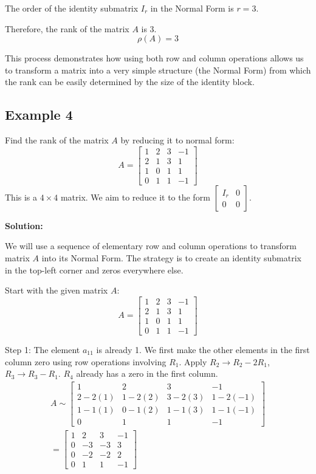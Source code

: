 \documentclass{article}
\begin{document}
The order of the identity submatrix $I_r$ in the Normal Form is $r=3$.

Therefore, the rank of the matrix $A$ is 3.
\[ \rho(A) = 3 \]

This process demonstrates how using both row and column operations allows us to transform a matrix into a very simple structure (the Normal Form) from which the rank can be easily determined by the size of the identity block.

\subsection{Example 4}
Find the rank of the matrix $A$ by reducing it to normal form:
\[ A = \begin{bmatrix} 1 & 2 & 3 & -1 \\ 2 & 1 & 3 & 1 \\ 1 & 0 & 1 & 1 \\ 0 & 1 & 1 & -1 \end{bmatrix} \]
This is a $4 \times 4$ matrix. We aim to reduce it to the form $\begin{bmatrix} I_r & 0 \\ 0 & 0 \end{bmatrix}$.

\textbf{Solution:}

We will use a sequence of elementary row and column operations to transform matrix $A$ into its Normal Form. The strategy is to create an identity submatrix in the top-left corner and zeros everywhere else.

Start with the given matrix $A$:
\[ A = \begin{bmatrix} 1 & 2 & 3 & -1 \\ 2 & 1 & 3 & 1 \\ 1 & 0 & 1 & 1 \\ 0 & 1 & 1 & -1 \end{bmatrix} \]

Step 1: The element $a_{11}$ is already 1. We first make the other elements in the first column zero using row operations involving $R_1$.
Apply $R_2 \to R_2 - 2R_1$, $R_3 \to R_3 - R_1$. $R_4$ already has a zero in the first column.
\begin{align*} A \sim \begin{bmatrix} 1 & 2 & 3 & -1 \\ 2 - 2(1) & 1 - 2(2) & 3 - 2(3) & 1 - 2(-1) \\ 1 - 1(1) & 0 - 1(2) & 1 - 1(3) & 1 - 1(-1) \\ 0 & 1 & 1 & -1 \end{bmatrix} \\ = \begin{bmatrix} 1 & 2 & 3 & -1 \\ 0 & -3 & -3 & 3 \\ 0 & -2 & -2 & 2 \\ 0 & 1 & 1 & -1 \end{bmatrix}\end{align*}
\end{document}
